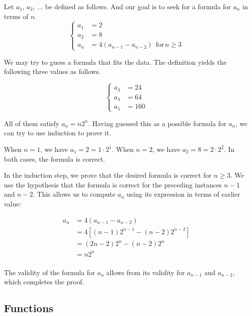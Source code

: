 \documentclass[../src/handouts/main.tex]{subfiles}
\begin{document}
Let $a_1,\, a_2,\, \ldots$ be defined as follows. And our goal is to seek for a formula for $a_n$ in terms of $n$.
$$
  \begin{cases}
    a_1 & = 2                                                   \\
    a_2 & = 8                                                   \\
    a_n & = 4 (a_{n - 1} - a_{n - 2}) \ \ \text{for}\, n \geq 3
  \end{cases}
$$

We may try to guess a formula that fits the data.
The definition yields the following three values as follows.

$$
  \begin{cases}
    a_3 & = 24  \\
    a_4 & = 64  \\
    a_5 & = 160
  \end{cases}
$$

All of them satisfy $a_n = n 2^n$.
Having guessed this as a possible formula for $a_n$, we can try to use induction to prove it.

When $n = 1$, we have $a_1 = 2 = 1 \cdot 2^1$.
When $n = 2$, we have $a_2 = 8 = 2 \cdot 2^2$.
In both cases, the formula is correct.

In the induction step, we prove that the desired formula is correct for $n \geq 3$.
We use the hypothesis that the formula is correct for the preceding instances $n - 1$ and $n - 2$.
This allows us to compute $a_n$ using its expression in terms of earlier value:

$$
  \begin{aligned}
    a_n & = 4 (a_{n - 1} - a_{n - 2})                             \\
        & = 4 \left[ (n - 1) 2^{n - 1} - (n - 2) 2^{n -2} \right] \\
        & = (2 n - 2) 2^n - (n - 2) 2^n                           \\
        & = n 2^n                                                 \\
  \end{aligned}
$$

The validity of the formula for $a_n$ allows from its validity for $a_{n -1}$ and $a_{n - 2}$, which completes the proof.

\subsection{Functions}\label{subsec:intro-function}
\end{document}
